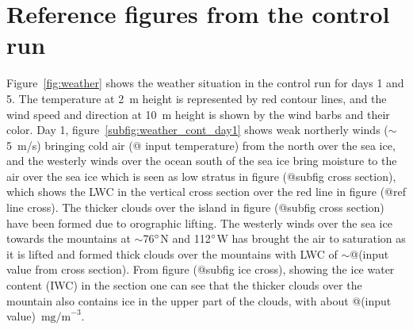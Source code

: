 \section{Reference figures from the control run}
Figure~\ref{fig:weather} shows the weather situation in the control run for days 1 and 5. The temperature at 2~m height is represented by red contour lines, and the wind speed and direction at 10~m height is shown by the 
wind barbs and their color. Day 1, figure~\ref{subfig:weather_cont_day1} shows weak northerly winds ($\sim$ 5~m/s) bringing cold air (@ input temperature) from the north over the sea ice, and the westerly winds over the ocean south of the sea ice bring moisture to the air over the sea ice which is seen as low stratus in figure (@subfig cross section), which shows the LWC in the vertical cross section over the red line in figure (@ref line cross). The thicker clouds over the island in figure (@subfig cross section) have been formed due to orographic lifting. The westerly winds over the sea ice towards the mountains at $\sim$76$\degree$N and 112$\degree$W has brought the air to saturation as it is lifted and formed thick clouds over the mountains with LWC of $\sim$@(input value from cross section). From figure (@subfig ice cross), showing the ice water content (IWC) in the section one can see that the thicker clouds over the mountain also contains ice in the upper part of the clouds, with about @(input value)~$\text{mg/m}^{-3}$. 

